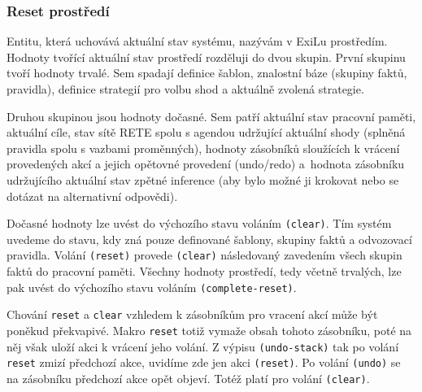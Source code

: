 \subsubsection{Reset prostředí}
Entitu, která uchovává aktuální stav systému, nazývám v ExiLu prostředím.
Hodnoty tvořící aktuální stav prostředí rozděluji do dvou skupin. První skupinu
tvoří hodnoty trvalé. Sem spadají definice šablon, znalostní báze (skupiny
faktů, pravidla), definice strategií pro volbu shod a aktuálně zvolená
strategie.

Druhou skupinou jsou hodnoty dočasné. Sem patří aktuální stav pracovní paměti,
aktuální cíle, stav sítě RETE spolu s agendou udržující aktuální shody (splněná
pravidla spolu s vazbami proměnných), hodnoty zásobníků sloužících k vrácení
provedených akcí a jejich opětovné provedení (undo/redo) a~hodnota zásobníku
udržujícího aktuální stav zpětné inference (aby bylo možné ji krokovat nebo se
dotázat na alternativní odpovědi).

Dočasné hodnoty lze uvést do výchozího stavu voláním \verb|(clear)|. Tím systém
uvedeme do stavu, kdy zná pouze definované šablony, skupiny faktů a odvozovací
pravidla. Volání \verb|(reset)| provede \verb|(clear)| následovaný zavedením
všech skupin faktů do pracovní paměti. Všechny hodnoty prostředí, tedy včetně
trvalých, lze pak uvést do výchozího stavu voláním \verb|(complete-reset)|.

Chování \verb|reset| a \verb|clear| vzhledem k zásobníkům pro vracení akcí
může být poněkud překvapivé. Makro \verb|reset| totiž vymaže obsah tohoto
zásobníku, poté na něj však uloží akci k vrácení jeho volání. Z výpisu
\verb|(undo-stack)| tak po volání \verb|reset| zmizí předchozí akce, uvidíme zde
jen akci \verb|(reset)|. Po volání \verb|(undo)| se na zásobníku předchozí akce
opět objeví. Totéž platí pro volání \verb|(clear)|.
